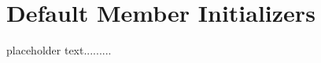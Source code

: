 \newpage
\section[Default Member Initializers]{Default Member Initializers}\label{Default-Member-Initializers}


placeholder text.........


